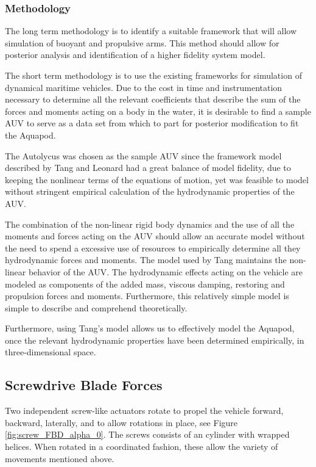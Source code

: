 \subsubsection{Methodology}

The long term methodology is to identify a suitable framework that will allow
simulation of buoyant and propulsive arms. This method should allow for
posterior analysis and identification of a higher fidelity system model.

The short term methodology is to use the existing frameworks for simulation of
dynamical maritime vehicles. Due to the cost in time and instrumentation
necessary to determine all the relevant coefficients that describe the sum of
the forces and moments acting on a body in the water, it is desirable to find a
sample AUV to serve as a data set from which to part for posterior modification
to fit the Aquapod.

The Autolycus was chosen as the sample AUV since the framework model described
by Tang and Leonard \cite{Tang1999} had a great balance of model fidelity, due
to keeping the nonlinear terms of the equations of motion, yet was feasible to
model without stringent empirical calculation of the hydrodynamic properties of
the AUV.

The combination of the non-linear rigid body dynamics and the use of all the
moments and forces acting on the AUV should allow an accurate model without the
need to spend a excessive use of resources to empirically determine all they
hydrodynamic forces and moments. The model used by Tang \cite{Tang1999}
maintains the non-linear behavior of the AUV. The hydrodynamic effects acting on
the vehicle are modeled as components of the added mass, viscous damping,
restoring and propulsion forces and moments. Furthermore, this relatively simple
model is simple to describe and comprehend theoretically.

Furthermore, using Tang's model allows us to effectively model the Aquapod, once
the relevant hydrodynamic properties have been determined empirically, in
three-dimensional space.




\subsection{Screwdrive Blade Forces}

Two independent screw-like actuators rotate to propel the vehicle forward,
backward, laterally, and to allow rotations in place, see Figure~
\ref{fig:screw_FBD_alpha_0}. The screws consists of an cylinder with wrapped
helices. When rotated in a coordinated fashion, these allow the variety of
movements mentioned above.

